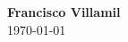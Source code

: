 \documentclass[a4paper, 10pt]{article}
\begin{document}
\thispagestyle{empty}


\vspace{8pt}



%



\begin{center}
{\bfseries\LARGE Francisco Villamil}\\\vspace{5pt}
\today
\end{center}

\vspace{8pt}

\end{document}
